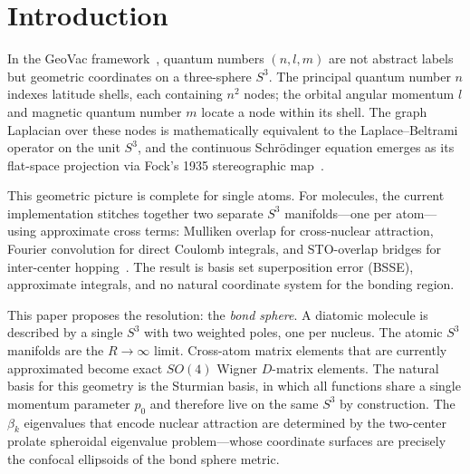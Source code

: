 \documentclass[aps,pra,twocolumn,superscriptaddress,longbibliography]{revtex4-2}
\begin{document}
\section{Introduction}
\label{sec:intro}

In the GeoVac framework~\cite{loutey_paper0,loutey_paper1,loutey_paper7},
quantum numbers $(n, l, m)$ are not abstract labels but geometric coordinates
on a three-sphere $S^3$.  The principal quantum number $n$ indexes latitude
shells, each containing $n^2$ nodes; the orbital angular momentum $l$ and
magnetic quantum number $m$ locate a node within its shell.  The graph
Laplacian over these nodes is mathematically equivalent to the Laplace--Beltrami
operator on the unit $S^3$, and the continuous Schr\"odinger equation emerges
as its flat-space projection via Fock's 1935 stereographic
map~\cite{Fock1935,loutey_paper7}.

This geometric picture is complete for single atoms.  For molecules, the
current implementation stitches together two separate $S^3$
manifolds---one per atom---using approximate cross terms: Mulliken overlap
for cross-nuclear attraction, Fourier convolution for direct Coulomb
integrals, and STO-overlap bridges for inter-center
hopping~\cite{loutey_fci}.  The result is basis set superposition error
(BSSE), approximate integrals, and no natural coordinate system for the
bonding region.

This paper proposes the resolution: the \emph{bond sphere}.  A diatomic
molecule is described by a single $S^3$ with two weighted poles, one per
nucleus.  The atomic $S^3$ manifolds are the $R \to \infty$ limit.
Cross-atom matrix elements that are currently approximated become exact
$SO(4)$ Wigner $D$-matrix elements.  The natural basis for this geometry
is the Sturmian basis, in which all functions share a single momentum
parameter $p_0$ and therefore live on the same $S^3$ by construction.
The $\beta_k$ eigenvalues that encode nuclear attraction are determined
by the two-center prolate spheroidal eigenvalue problem---whose coordinate
surfaces are precisely the confocal ellipsoids of the bond sphere metric.
\end{document}
